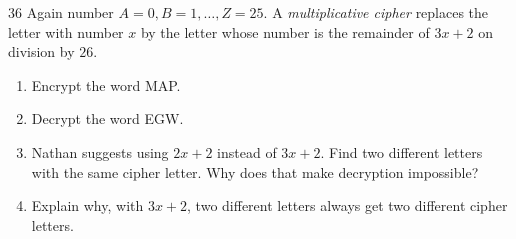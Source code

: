 \begin{probbox}{36}{}
Again number $A = 0, B = 1, \dots, Z = 25$. A \emph{multiplicative cipher} replaces the letter with number $x$ by the letter whose number
is the remainder of $3x + 2$ on division by $26$.
\begin{enumerate}[label=\alph*),leftmargin=1.6em,itemsep=1pt,topsep=2pt]
  \item Encrypt the word \textsf{MAP}.
  \item Decrypt the word \textsf{EGW}.
  \item Nathan suggests using $2x + 2$ instead of $3x + 2$. Find two different letters with the same cipher letter. Why does that make
  decryption impossible?
  \item Explain why, with $3x + 2$, two different letters always get two different cipher letters.
\end{enumerate}
\end{probbox}

